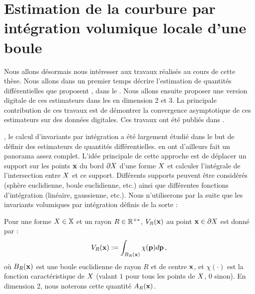 \section{Estimation de la courbure par intégration volumique locale d'une boule}
\label{sec:estimators:volume}
%
Nous allons désormais nous intéresser aux travaux réalisés au cours de cette
thèse. Nous allons dans un premier temps décrire l'estimation de quantités
différentielles que proposent ,
dans le . Nous allons ensuite proposer une
version digitale de ces estimateurs dans les 
en dimension 2 et 3. La principale contribution de ces travaux est de démontrer
la convergence asymptotique de ces estimateurs sur des données digitales. Ces
travaux ont été publiés dans \cite{DGCI2013,CVIU2014}.

\GeometryProcessing, le calcul d'invariants par intégration a été largement
étudié dans le but de définir des estimateurs de quantités différentielles.
 en ont d'ailleurs fait un
panorama assez complet. L'idée principale de cette approche est de déplacer un support
sur les points $\mathbf{x}$ du bord $\partial X$ d'une forme $X$ et calculer
l'intégrale de l'intersection entre $X$ et ce support. Différents supports
peuvent être considérés (sphère euclidienne, boule euclidienne, etc.) ainsi que
différentes fonctions d'intégration (linéaire, gaussienne, etc.). Nous
n'utiliserons par la suite que les invariants volumiques par intégration définis
de la sorte :
%
\begin{definition}
  \label{def:Volume}
  Pour une forme $X \in \mathbb{X}$ et un rayon $R \in \mathbb{R}^{+*}$,  $V_R(\mathbf{x})$ au point $\mathbf{x} \in \partial X$ est donné par :
  \begin{equation}
    V_R(\mathbf{x}) := \int_{B_{R}(\mathbf{x})} \chi(\mathbf{p})d\mathbf{p}\,,
  \end{equation}
  où $B_{R}(\mathbf{x})$ est une boule euclidienne de rayon $R$ et de centre $\mathbf{x}$,
  et $\chi(\cdot)$ est la fonction caractéristique de $X$ (valant $1$ pour
  tous les points de $X$, $0$ sinon). En dimension 2, nous noterons cette
  quantité $A_R(\mathbf{x})$.
\end{definition}
%
